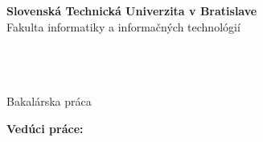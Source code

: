 \begin{center}
\thispagestyle{empty}


{\Large \bf Slovenská Technická Univerzita v Bratislave}\\[\baselineskip]
{\large Fakulta informatiky a informačných technológií}

\noindent\makebox[\linewidth]{\rule{\textwidth}{1pt}} 


\hspace{0.5cm}

{\large \bf \FIIT}\\
\vspace*{4.5cm}
{\Large \Author}\\[\baselineskip]
{\huge \bf \Titlesk}\\[\baselineskip]
{\large Bakalárska práca}\\

\end{center}
\vspace{5.5cm}
{\bf Vedúci práce:} \Supervisor \\
\\
 \Monthsk    \Year